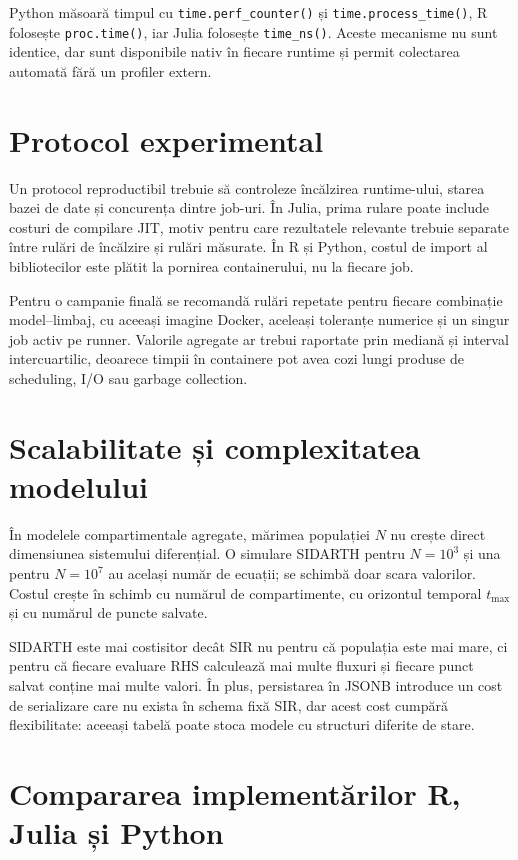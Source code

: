 Python măsoară timpul cu \texttt{time.perf\_counter()} și
\texttt{time.process\_time()}, R folosește \texttt{proc.time()}, iar Julia
folosește \texttt{time\_ns()}. Aceste mecanisme nu sunt identice, dar sunt
disponibile nativ în fiecare runtime și permit colectarea automată fără un profiler
extern.

\section{Protocol experimental}
\label{subsec:protocoale}

Un protocol reproductibil trebuie să controleze încălzirea runtime-ului, starea
bazei de date și concurența dintre job-uri. În Julia, prima rulare poate include
costuri de compilare JIT, motiv pentru care rezultatele relevante trebuie separate
între rulări de încălzire și rulări măsurate. În R și Python, costul de import al
bibliotecilor este plătit la pornirea containerului, nu la fiecare job.

Pentru o campanie finală se recomandă rulări repetate pentru fiecare combinație
model--limbaj, cu aceeași imagine Docker, aceleași toleranțe numerice și un singur
job activ pe runner. Valorile agregate ar trebui raportate prin mediană și
interval intercuartilic, deoarece timpii în containere pot avea cozi lungi produse
de scheduling, I/O sau garbage collection.

\section{Scalabilitate și complexitatea modelului}
\label{sec:scalabilitate_date}

În modelele compartimentale agregate, mărimea populației $N$ nu crește direct
dimensiunea sistemului diferențial. O simulare SIDARTH pentru $N=10^3$ și una
pentru $N=10^7$ au același număr de ecuații; se schimbă doar scara valorilor.
Costul crește în schimb cu numărul de compartimente, cu orizontul temporal
$t_{\max}$ și cu numărul de puncte salvate.

SIDARTH este mai costisitor decât SIR nu pentru că populația este mai mare, ci
pentru că fiecare evaluare RHS calculează mai multe fluxuri și fiecare punct salvat
conține mai multe valori. În plus, persistarea în JSONB introduce un cost de
serializare care nu exista în schema fixă SIR, dar acest cost cumpără flexibilitate:
aceeași tabelă poate stoca modele cu structuri diferite de stare.

\section{Compararea implementărilor R, Julia și Python}
\label{sec:comparatie_timp}

